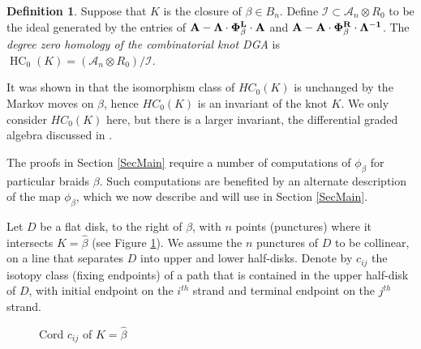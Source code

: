 \documentclass[11pt]{amsart}
\def\A{{\mathcal A}}
\theoremstyle{definition}
\newtheorem{defn}[thm]{Definition}
\begin{document}
  \begin{defn}
  Suppose that $K$ is the closure of $\beta\in B_n$. Define $\mathcal{I}\subset \A_n\otimes R_0$ to be the ideal generated by the entries of $\bf{A} - \Lambda\cdot\Phi_\beta^L\cdot \bf{A}$ and $\bf{A} - \bf{A}\cdot\Phi_\beta^R\cdot\Lambda^{-1}$. The \emph{degree zero homology of the combinatorial knot DGA} is $\operatorname{HC}_0(K) = (\A_n\otimes R_0)/\mathcal{I}$.
  \label{defn:HC_0}
  \end{defn}
  
  It was shown in \cite{Ng08} that the isomorphism class of $HC_0(K)$ is unchanged by the Markov moves on $\beta$, hence $HC_0(K)$ is an invariant of the knot $K$. We only consider $HC_0(K)$ here, but there is a larger invariant, the differential graded algebra discussed in \cite{Ng12}.

  The proofs in Section \ref{SecMain} require a number of computations of $\phi_\beta$ for particular braids $\beta$. Such computations are benefited by an alternate description of the map $\phi_\beta$, which we now describe and will use in Section \ref{SecMain}.

  Let $D$ be a flat disk, to the right of $\beta$, with $n$ points (punctures) where it intersects $K=\hat{\beta}$ (see Figure \ref{FigA_nGens}). We assume the $n$ punctures of $D$ to be collinear, on a line that separates $D$ into upper and lower half-disks. Denote by $c_{ij}$ the isotopy class (fixing endpoints) of a path that is contained in the upper half-disk of $D$, with initial endpoint on the $i^{th}$ strand and terminal endpoint on the $j^{th}$ strand.

  \begin{figure}[ht]
\caption{Cord $c_{ij}$ of $K=\hat \beta$}
\label{FigA_nGens}
\end{figure}
\end{document}
